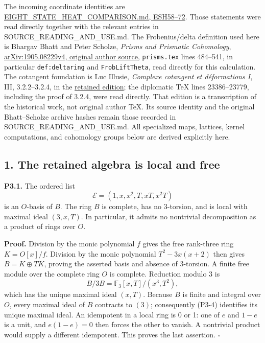 \documentclass[
  10pt,
]{article}
\begin{document}
The incoming coordinate identities are
\href{https://github.com/KokunoYumeto/zeta-function-research-reader/blob/d5c9d198a8432e3ede468b280162a99c00e3f4f7/workbenches/splitzero-tandem/branches/tau-zero-prime-positivity/EIGHT_STATE_HEAT_COMPARISON.md}{EIGHT\_STATE\_HEAT\_COMPARISON.md,
ESH58--72}. Those statements were read directly together with the
relevant entries in SOURCE\_READING\_AND\_USE.md. The Frobenius/delta
definition used here is Bhargav Bhatt and Peter Scholze, \emph{Prisms
and Prismatic Cohomology},
\href{https://arxiv.org/src/1905.08229v4}{arXiv:1905.08229v4, original
author source}, \texttt{prisms.tex} lines 484--541, in particular
\texttt{def:deltaring} and \texttt{FrobLiftTheta}, read directly for
this calculation. The cotangent foundation is Luc Illusie,
\emph{Complexe cotangent et déformations I}, III, 3.2.2--3.2.4, in the
\href{https://zenodo.org/records/22884471}{retained edition}; the
diplomatic TeX lines 23386--23779, including the proof of 3.2.4, were
read directly. That edition is a transcription of the historical work,
not original author TeX. Its source identity and the original
Bhatt--Scholze archive hashes remain those recorded in
SOURCE\_READING\_AND\_USE.md. All specialized maps, lattices, kernel
computations, and cohomology groups below are derived explicitly here.

\subsection{1. The retained algebra is local and
free}\label{the-retained-algebra-is-local-and-free}

\textbf{P3.1.} The ordered list \[
\mathcal E=(1,x,x^2,T,xT,x^2T)
\tag{P3-3}
\] is an \(O\)-basis of \(B\). The ring \(B\) is complete, has no
3-torsion, and is local with maximal ideal \((3,x,T)\). In particular,
it admits no nontrivial decomposition as a product of rings over \(O\).

\textbf{Proof.} Division by the monic polynomial \(f\) gives the free
rank-three ring \(K=O[x]/f\). Division by the monic polynomial
\(T^2-3x(x+2)\) then gives \(B=K\oplus TK\), proving the asserted basis
and absence of 3-torsion. A finite free module over the complete ring
\(O\) is complete. Reduction modulo 3 is \[
B/3B=\mathbb F_3[x,T]/(x^3,T^2),
\tag{P3-4}
\] which has the unique maximal ideal \((x,T)\). Because \(B\) is finite
and integral over \(O\), every maximal ideal of \(B\) contracts to
\((3)\); consequently (P3-4) identifies its unique maximal ideal. An
idempotent in a local ring is 0 or 1: one of \(e\) and \(1-e\) is a
unit, and \(e(1-e)=0\) then forces the other to vanish. A nontrivial
product would supply a different idempotent. This proves the last
assertion. \(\square\)
\end{document}
